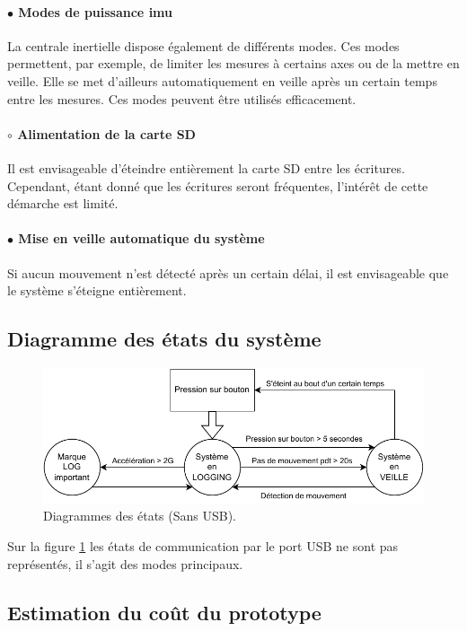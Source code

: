 \paragraph*{$\bullet$ Modes de puissance \gls{imu}} La centrale inertielle dispose également de différents modes. Ces modes permettent, par exemple, de limiter les mesures à certains axes ou de la mettre en veille. Elle se met d'ailleurs automatiquement en veille après un certain temps entre les mesures. Ces modes peuvent être utilisés efficacement.

\paragraph*{$\circ$ Alimentation de la carte SD} Il est envisageable d'éteindre entièrement la carte SD entre les écritures. Cependant, étant donné que les écritures seront fréquentes, l'intérêt de cette démarche est limité.

\paragraph*{$\bullet$ Mise en veille automatique du système} Si aucun mouvement n'est détecté après un certain délai, il est envisageable que le système s'éteigne entièrement.

\subsection{Diagramme des états du système} 

\begin{figure}[h]
	\centering
	\includegraphics[width=0.8\linewidth]{../figures/pre_etude/Diagramme_Etat_Preetude}
	\caption{Diagrammes des états (Sans USB).}
	\label{fig:diagrammeetatpreetude}
\end{figure}

Sur la figure \ref{fig:diagrammeetatpreetude} les états de communication par le port USB ne sont pas représentés, il s'agit des modes principaux.


\clearpage

\subsection{Estimation du coût du prototype} \label{ssec:Estimation-Couts}

